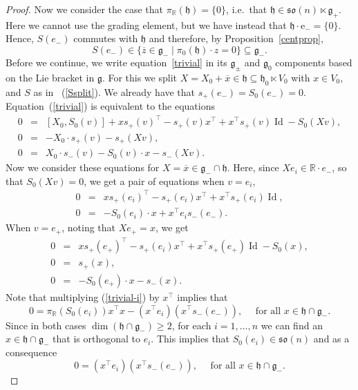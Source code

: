 \documentclass[11pt,a4paper]{amsart}
\DeclareMathOperator{\Id}{Id}
\newcommand{\g}{\mathfrak{g}}
\newcommand{\h}{\mathfrak{h}}
\newcommand{\+}{\oplus}
\newcommand{\so}{\mathfrak{so}}
\newcommand{\1}{\mathbf{1}}
\newcommand{\e}{\mathrm{e}}
\newcommand{\R}{\mathbb{R}} %
\newcommand{\<}{\langle}
\renewcommand{\>}{\rangle}
\theoremstyle{definition}
\theoremstyle{plain}
\numberwithin{equation}{section}
\begin{document}
\begin{proof}
Now we consider the case that 
$\pi_\R(\h)=\{0\}$, i.e.~that $\h\in \so(n)\ltimes \g_+$. Here we cannot use the grading element, but we have instead that $\h\cdot \e_-=\{0\}$. Hence, $S(e_-)$ commutes with $\h$ and therefore, by Proposition~\ref{centprop}, 
\[S(e_-)\in \{\overline{z}\in\g_-\mid \pi_0(\h)\cdot z=0\}\subseteq \g_-.\] 
Before we continue, we write equation~\ref{trivial} in its $\g_\pm$ and $\g_0$ components based on the Lie bracket in $\g$. For this we  split $X=X_0+\overline{x}\in\h\subseteq \h_0\ltimes V_0$ with $x\in V_0$, and $S$ as in ~(\ref{Ssplit}).
We already have that $s_+(e_-)=S_0(e_-)=0$.
Equation~(\ref{trivial}) is equivalent to the equations
\begin{eqnarray}
\label{trivial0}
0&=& [X_0,S_0(v)] + x s_+(v)^\top -s_+(v)x^\top +x^\top s_+(v)\Id - S_0(Xv),
\\
\label{trivial+}
0&=&-X_0\cdot s_+(v)-s_+(Xv),
\\
\label{trivial-}
0&=&X_0\cdot s_-(v) -S_0(v)\cdot x -s_-(Xv).
\end{eqnarray}
Now we consider these equations for $X=\overline{x}\in \g_-\cap \h$. Here, since  $Xe_i\in \R\cdot e_-$, so that $S_0(Xv)=0$, we get a pair of equations when $v=e_i$,
\begin{eqnarray}
\label{trivial0i}
0&=&  x s_+(e_i)^\top  -s_+(e_i)x^\top+x^\top s_+(e_i)\Id,
\\
\label{trivial-i}
0&=& -S_0(e_i)\cdot x +x^\top e_i s_-(e_-).
\end{eqnarray}
When $v=e_+$, noting that $Xe_+=x$, we get
\begin{eqnarray}
\label{trivial0+}
0&=& x s_+(e_+)^\top -s_+(e_i)x^\top+x^\top s_+(e_+)\Id - S_0(x),
\\
\label{trivial++}
0&=&s_+(x),
\\
\label{trivial-+}
0&=&-S_0(e_+)\cdot x -s_-(x).
\end{eqnarray}
Note that multiplying (\ref{trivial-i}) by $x^\top$ implies that 
\begin{equation}
\label{trivial-i2}
0=\pi_\R(S_0(e_i)) x^\top x - (x^\top e_i)(x^\top s_-(e_-)),\quad \text{ for all }x\in \h\cap \g_-.
\end{equation}
Since in both cases $\dim(\h\cap \g_-)\ge 2$,  for each $i=1, \ldots, n$ we can  find an $x\in \h\cap \g_-$ that is orthogonal to $e_i$. This implies that $S_0(e_i)\in \so(n)$ and as a consequence
\begin{equation}
\label{trivial-i2a}
0= (x^\top e_i)(x^\top s_-(e_-)),\quad \text{ for all }x\in \h\cap \g_-.
\end{equation}



\end{proof}
\end{document}
